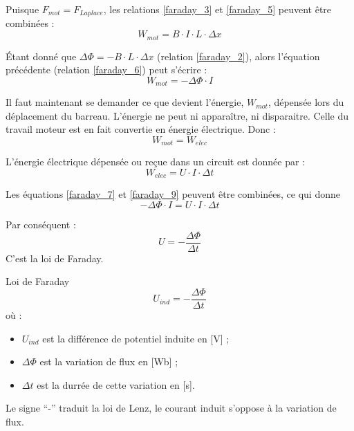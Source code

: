 Puisque \(F_{mot} = F_{Laplace}\), les relations \ref{faraday_3} et \ref{faraday_5} peuvent être combinées :
\begin{equation}\label{faraday_6}
    W_{mot} = B \cdot I \cdot L \cdot \Delta x
\end{equation}

Étant donné que \(\Delta \Phi = - B \cdot L \cdot \Delta x \) (relation \ref{faraday_2}),  alors l'équation précédente (relation \ref{faraday_6}) peut s'écrire :
\begin{equation}\label{faraday_7}
    W_{mot} = - \Delta \Phi \cdot I
\end{equation}

Il faut maintenant se demander ce que devient l'énergie, \(W_{mot}\), dépensée lors du déplacement du barreau. L'énergie ne peut ni apparaître, ni disparaitre. Celle du travail moteur est en fait convertie en énergie électrique. Donc :
\begin{equation}\label{faraday_8}
    W_{mot}=W_{elec}
\end{equation}

L'énergie électrique dépensée ou reçue dans un circuit est donnée par :
\begin{equation}\label{faraday_9}
    W_{elec}=U \cdot I \cdot \Delta t
\end{equation}

Les équations \ref{faraday_7} et \ref{faraday_9} peuvent être combinées, ce qui donne
\begin{equation}
    - \Delta \Phi \cdot I = U \cdot I \cdot \Delta t
\end{equation}

Par conséquent :
\begin{equation}
    U = - \frac{\Delta \Phi}{\Delta t}
\end{equation} C'est la loi de Faraday.


\begin{encadre_equation*}{Loi de Faraday}
    \begin{equation}
        U_{ind} = - \frac{\Delta \Phi}{\Delta t}
    \end{equation} où :
    \begin{itemize}[label=\textbullet]
        \item \( U_{ind} \)  est la différence de potentiel induite en [V] ;
        \item \(\Delta \Phi \) est la variation de flux en [Wb] ;
        \item \( \Delta t\) est la durrée de cette variation en [s].
    \end{itemize}
    Le signe \enquote{-} traduit la loi de Lenz, le courant induit s'oppose à la variation de flux.
\end{encadre_equation*}

